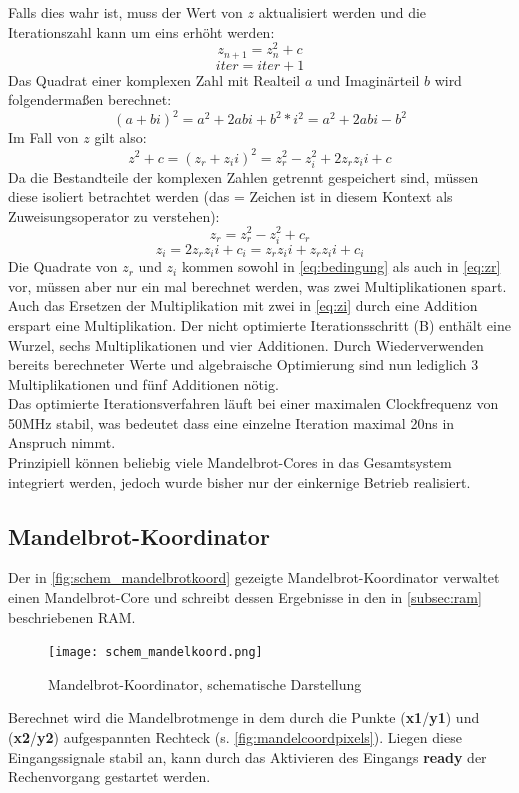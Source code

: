 \documentclass[a4paper,12pt,onesided]{report}
\begin{document}
Falls dies wahr ist, muss der Wert von $z$ aktualisiert werden und die Iterationszahl kann um eins erhöht werden:
\[z_{n+1} = z_n^2 + c\]
\[iter = iter + 1\]
Das Quadrat einer komplexen Zahl mit Realteil $a$ und Imaginärteil $b$ wird folgendermaßen berechnet:
\[(a + bi)^2 = a^2 + 2abi + b^2*i^2 = a^2 + 2abi - b^2\]
Im Fall von $z$ gilt also:
\[z^2+c=(z_r + z_ii)^2 = z_r^2 - z_i^2 + 2z_rz_ii + c\]
Da die Bestandteile der komplexen Zahlen getrennt gespeichert sind, müssen diese isoliert betrachtet werden (das = Zeichen ist in diesem Kontext als Zuweisungsoperator zu verstehen):
\begin{equation}
	\label{eq:zr}
	z_r = z_r^2 - z_i^2 + c_r
\end{equation}
\begin{equation}
	\label{eq:zi}
	z_i = 2z_rz_ii + c_i = z_rz_ii + z_rz_ii + c_i
\end{equation}
Die Quadrate von $z_r$ und $z_i$ kommen sowohl in \autoref{eq:bedingung} als auch in \autoref{eq:zr} vor, müssen aber nur ein mal berechnet werden, was zwei Multiplikationen spart.\\
Auch das Ersetzen der Multiplikation mit zwei in \autoref{eq:zi} durch eine Addition erspart eine Multiplikation.
Der nicht optimierte Iterationsschritt (B) enthält eine Wurzel, sechs Multiplikationen und vier Additionen.
Durch Wiederverwenden bereits berechneter Werte und algebraische Optimierung sind nun lediglich 3 Multiplikationen und fünf Additionen nötig.\\
Das optimierte Iterationsverfahren läuft bei einer maximalen Clockfrequenz von 50MHz stabil, was bedeutet dass eine einzelne Iteration maximal 20ns in Anspruch nimmt.\\
Prinzipiell können beliebig viele Mandelbrot-Cores in das Gesamtsystem integriert werden, jedoch wurde bisher nur der einkernige Betrieb realisiert.

\subsection{Mandelbrot-Koordinator}
Der in \autoref{fig:schem_mandelbrotkoord} gezeigte Mandelbrot-Koordinator verwaltet einen Mandelbrot-Core und schreibt dessen Ergebnisse in den in \autoref{subsec:ram} beschriebenen RAM.

\begin{figure}[H]
	\centering
	\texttt{[image: schem\_mandelkoord.png]}
	\caption{Mandelbrot-Koordinator, schematische Darstellung}
	\label{fig:schem_mandelbrotkoord}
\end{figure}
Berechnet wird die Mandelbrotmenge in dem durch die Punkte (\textbf{x1}/\textbf{y1}) und (\textbf{x2}/\textbf{y2}) aufgespannten Rechteck (s. \autoref{fig:mandelcoordpixels}).
Liegen diese Eingangssignale stabil an, kann durch das Aktivieren des Eingangs \textbf{ready} der Rechenvorgang gestartet werden.
\end{document}
